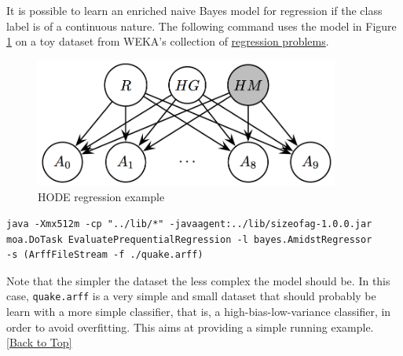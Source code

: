 \documentclass[10pt,a4paper]{article}
\begin{document}
It is possible to learn an enriched naive Bayes model for regression if the class label is of a continuous nature. The following command uses the model in Figure \ref{fig:bns:moalink:HODEreg} on a toy dataset from WEKA's collection of \href{http://prdownloads.sourceforge.net/weka/datasets-numeric.jar}{regression problems}.

\begin{figure}[h!]
	\centering
	\includegraphics[width=10cm]{img/regressionHODE.jpg}
	\caption{HODE regression example}
	\label{fig:bns:moalink:HODEreg}	
\end{figure}

\begin{lstlisting}
java -Xmx512m -cp "../lib/*" -javaagent:../lib/sizeofag-1.0.0.jar 
moa.DoTask EvaluatePrequentialRegression -l bayes.AmidstRegressor
-s (ArffFileStream -f ./quake.arff)
\end{lstlisting}

Note that the simpler the dataset the less complex the model should be. In this case, \texttt{quake.arff} is a very simple and small dataset that should probably be learn with a more simple classifier, that is, a high-bias-low-variance classifier, in order to avoid overfitting. This aims at providing a simple running example.
\hyperref[sec:bns]{[Back to Top]}\newline 
\end{document}
